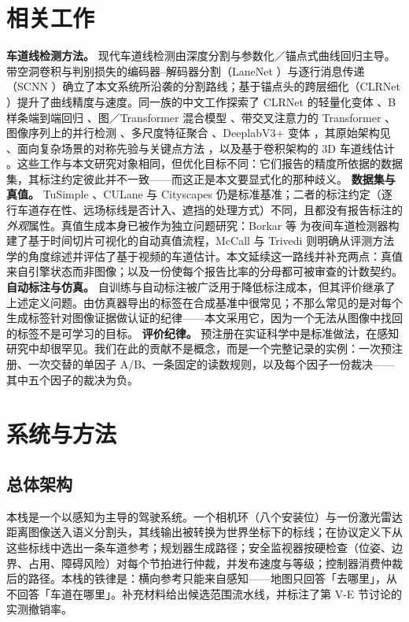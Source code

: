 \documentclass[journal]{IEEEtran}
\begin{document}
\section{相关工作}
\textbf{车道线检测方法。} 现代车道线检测由深度分割与参数化／锚点式曲线回归主导。带空洞卷积与判别损失的编码器--解码器分割（LaneNet \cite{neven2018lanenet}）与逐行消息传递（SCNN \cite{pan2018scnn}）确立了本文系统所沿袭的分割路线；基于锚点头的跨层细化（CLRNet \cite{zheng2022clrnet}）提升了曲线精度与速度。同一族的中文工作探索了 CLRNet 的轻量化变体 \cite{chen2026clrnetlight}、B 样条端到端回归 \cite{huang2026bspline}、图／Transformer 混合模型 \cite{jia2026gnn}、带交叉注意力的 Transformer \cite{li2026xca}、图像序列上的并行检测 \cite{zhu2024parallel}、多尺度特征聚合 \cite{hu2026multiscale}、DeeplabV3+ 变体 \cite{shuai2026deeplab}，其原始架构见 \cite{chen2018deeplab}、面向复杂场景的对称先验与关键点方法 \cite{lu2026symmetry}，以及基于卷积架构的 3D 车道线估计 \cite{chen2025threed}。这些工作与本文研究对象相同，但优化目标不同：它们报告的精度所依据的数据集，其标注约定彼此并不一致------而这正是本文要显式化的那种歧义。
\textbf{数据集与真值。} TuSimple \cite{tusimple2017}、CULane \cite{pan2018scnn} 与 Cityscapes \cite{cordts2016cityscapes} 仍是标准基准；二者的标注约定（逐行车道存在性、远场标线是否计入、遮挡的处理方式）不同，且都没有报告标注的\emph{外观}属性。真值生成本身已被作为独立问题研究：Borkar 等 \cite{borkar2012groundtruth} 为夜间车道检测器构建了基于时间切片可视化的自动真值流程，McCall 与 Trivedi \cite{mccall2006video} 则明确从评测方法学的角度综述并评估了基于视频的车道估计。本文延续这一路线并补充两点：真值来自引擎状态而非图像；以及一份使每个报告比率的分母都可被审查的计数契约。
\textbf{自动标注与仿真。} 自训练与自动标注被广泛用于降低标注成本，但其评价继承了上述定义问题。由仿真器导出的标签在合成基准中很常见；不那么常见的是对每个生成标签针对图像证据做认证的纪律------本文采用它，因为一个无法从图像中找回的标签不是可学习的目标。
\textbf{评价纪律。} 预注册在实证科学中是标准做法，在感知研究中却很罕见。我们在此的贡献不是概念，而是一个完整记录的实例：一次预注册、一次交替的单因子 A/B、一条固定的读数规则，以及每个因子一份裁决------其中五个因子的裁决为负。
\section{系统与方法}
\subsection{总体架构}
本栈是一个以感知为主导的驾驶系统。一个相机环（八个安装位）与一份激光雷达距离图像送入语义分割头，其线输出被转换为世界坐标下的标线；在协议定义下从这些标线中选出一条车道参考；规划器生成路径；安全监视器按硬检查（位姿、边界、占用、障碍风险）对每个节拍进行仲裁，并发布速度与等级；控制器消费仲裁后的路径。本栈的铁律是：横向参考只能来自感知------地图只回答「去哪里」，从不回答「车道在哪里」。补充材料给出候选范围流水线，并标注了第 V-E 节讨论的实测撤销率。
\end{document}
